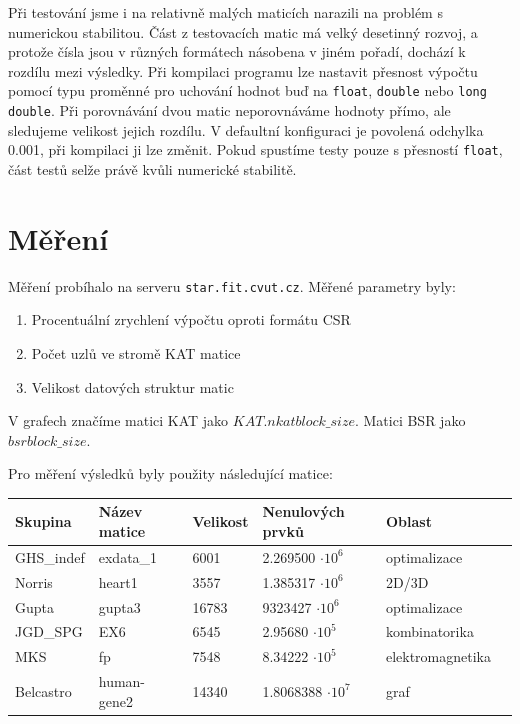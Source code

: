 Při testování jsme i na relativně malých maticích narazili na problém s numerickou stabilitou. Část z testovacích matic má velký desetinný rozvoj, a protože čísla jsou v různých formátech násobena v jiném pořadí, dochází k rozdílu mezi výsledky. Při kompilaci programu lze nastavit přesnost výpočtu pomocí typu proměnné pro uchování hodnot buď na \texttt{float}, \texttt{double} nebo \texttt{long double}. Při porovnávání dvou matic neporovnáváme hodnoty přímo, ale sledujeme velikost jejich rozdílu. V defaultní konfiguraci je povolená odchylka 0.001, při kompilaci ji lze změnit. Pokud spustíme testy  pouze s přesností \texttt{float}, část testů selže právě kvůli numerické stabilitě. 





\section{Měření}

Měření probíhalo na serveru \texttt{star.fit.cvut.cz}. Měřené parametry byly:
\begin{enumerate}
  \item Procentuální zrychlení výpočtu oproti formátu CSR
  \item Počet uzlů ve stromě KAT matice
  \item Velikost datových struktur matic
\end{enumerate}

V grafech značíme matici KAT jako $KAT.n kat block\_size$. Matici BSR jako $bsr block\_size$. 

Pro měření výsledků byly použity následující matice:

\begin{table}[H]
   \begin{tabular}{llllll}
    Skupina    & Název matice & Velikost & Nenulových prvků            & Oblast                  \\
    \hline
    GHS\_indef 	& exdata\_1 \cite{mtxexdata}    &  6001    & 2.269500 $\cdot 10^6$ & optimalizace \\
    Norris     	& heart1 \cite{mtxheart}       & 3557    & 1.385317 $\cdot 10^6$ & 2D/3D          \\
    Gupta     	& gupta3 \cite{mtxgupta}       &  16783    & 9323427 $\cdot 10^6$ & optimalizace         \\
    JGD\_SPG    	& EX6 \cite{mtxex}       & 6545     & 2.95680 $\cdot 10^5$ & kombinatorika \\
    MKS     		& fp \cite{mtxfp}       & 7548     & 8.34222 $\cdot 10^5$ & elektromagnetika         \\
    Belcastro   	& human-gene2 \cite{mtxhuman}        & 14340    & 1.8068388 $\cdot 10^7$ & graf         \\
    \end{tabular}
\end{table}

